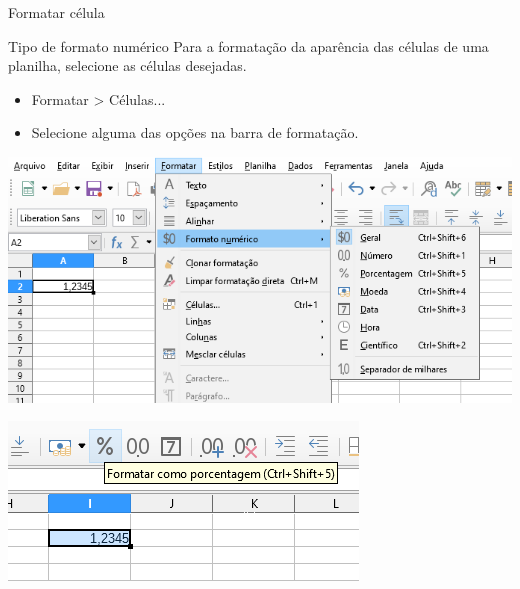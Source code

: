\begin{frame}{Formatar célula}
	\begin{block}{Tipo de formato numérico}
		Para a formatação da aparência das células de uma planilha, selecione as células desejadas.
		\begin{itemize}
			\item Formatar > Células...
			\item Selecione alguma das opções na barra de formatação.
		\end{itemize}
	\end{block}
	
	\begin{minipage}{0.49\linewidth}
		\centering
		\includegraphics[width=1\linewidth]{Figuras/Ch06/fig32}
	\end{minipage}\hfill
	\begin{minipage}{0.49\linewidth}
		\centering
		\includegraphics[width=1\linewidth]{Figuras/Ch06/fig33}
	\end{minipage}
\end{frame}


